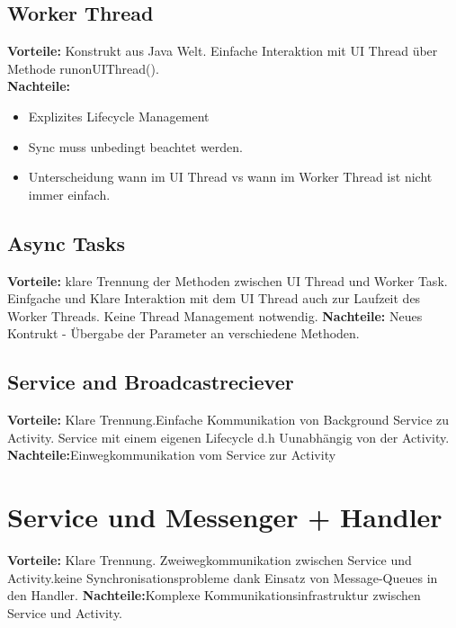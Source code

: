 \documentclass[a4paper,10pt,titlepage=false]{scrreprt}
\begin{document}
\subsection{Worker Thread}
\textbf{Vorteile:} Konstrukt aus Java Welt. Einfache Interaktion mit UI Thread über Methode runonUIThread().\\
\textbf{Nachteile:} 
\begin{itemize}
\item Explizites Lifecycle Management
\item Sync muss unbedingt beachtet werden.
\item Unterscheidung wann im UI Thread vs wann im Worker Thread ist nicht immer einfach.
\end{itemize}

\subsection{Async Tasks}
\textbf{Vorteile:} klare Trennung der Methoden zwischen UI Thread und Worker Task. Einfgache und Klare Interaktion mit dem UI Thread auch zur Laufzeit des Worker Threads. Keine Thread Management notwendig. 
\textbf{Nachteile:} Neues Kontrukt - Übergabe der Parameter an verschiedene Methoden.
\subsection{Service and Broadcastreciever}
\textbf{Vorteile:} Klare Trennung.Einfache Kommunikation von Background Service zu Activity. Service mit einem eigenen Lifecycle d.h Uunabhängig von der Activity.
\textbf{Nachteile:}Einwegkommunikation vom Service zur Activity
\section{Service und Messenger + Handler}
\textbf{Vorteile:} Klare Trennung. Zweiwegkommunikation zwischen Service und
Activity.keine Synchronisationsprobleme dank Einsatz von
Message-Queues in den Handler.
\textbf{Nachteile:}Komplexe Kommunikationsinfrastruktur zwischen
Service und Activity.
\end{document}
